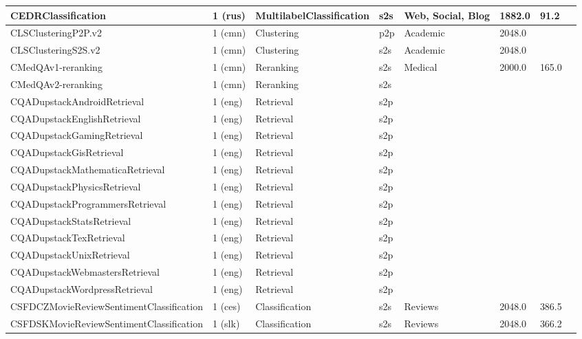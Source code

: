 \begin{longtable}{L{5.0cm}|L{1.5cm}L{1.4cm}L{1.4cm}L{1.4cm}L{1.4cm}L{1.0cm}L{1.0cm}}
 \hline 
CEDRClassification \cite{sboev2021data} & 1 (rus) & MultilabelClassification & s2s & Web, Social, Blog & 1882.0 & 91.2 \\
 \hline 
CLSClusteringP2P.v2 \cite{li2022csl} & 1 (cmn) & Clustering & p2p & Academic & 2048.0 &  \\
 \hline 
CLSClusteringS2S.v2 \cite{li2022csl} & 1 (cmn) & Clustering & s2s & Academic & 2048.0 &  \\
 \hline 
CMedQAv1-reranking \cite{zhang2017chinese} & 1 (cmn) & Reranking & s2s & Medical & 2000.0 & 165.0 \\
 \hline 
CMedQAv2-reranking \cite{8548603} & 1 (cmn) & Reranking & s2s &  &  &  \\
 \hline 
CQADupstackAndroidRetrieval \cite{hoogeveen2015} & 1 (eng) & Retrieval & s2p &  &  &  \\
 \hline 
CQADupstackEnglishRetrieval \cite{hoogeveen2015} & 1 (eng) & Retrieval & s2p &  &  &  \\
 \hline 
CQADupstackGamingRetrieval \cite{hoogeveen2015} & 1 (eng) & Retrieval & s2p &  &  &  \\
 \hline 
CQADupstackGisRetrieval \cite{hoogeveen2015} & 1 (eng) & Retrieval & s2p &  &  &  \\
 \hline 
CQADupstackMathematicaRetrieval \cite{hoogeveen2015} & 1 (eng) & Retrieval & s2p &  &  &  \\
 \hline 
CQADupstackPhysicsRetrieval \cite{hoogeveen2015} & 1 (eng) & Retrieval & s2p &  &  &  \\
 \hline 
CQADupstackProgrammersRetrieval \cite{hoogeveen2015} & 1 (eng) & Retrieval & s2p &  &  &  \\
 \hline 
CQADupstackStatsRetrieval \cite{hoogeveen2015} & 1 (eng) & Retrieval & s2p &  &  &  \\
 \hline 
CQADupstackTexRetrieval \cite{hoogeveen2015} & 1 (eng) & Retrieval & s2p &  &  &  \\
 \hline 
CQADupstackUnixRetrieval \cite{hoogeveen2015} & 1 (eng) & Retrieval & s2p &  &  &  \\
 \hline 
CQADupstackWebmastersRetrieval \cite{hoogeveen2015} & 1 (eng) & Retrieval & s2p &  &  &  \\
 \hline 
CQADupstackWordpressRetrieval \cite{hoogeveen2015} & 1 (eng) & Retrieval & s2p &  &  &  \\
 \hline 
CSFDCZMovieReviewSentimentClassification \cite{štefánik2023resources} & 1 (ces) & Classification & s2s & Reviews & 2048.0 & 386.5 \\
 \hline 
CSFDSKMovieReviewSentimentClassification \cite{štefánik2023resources} & 1 (slk) & Classification & s2s & Reviews & 2048.0 & 366.2 \\

\end{longtable}
